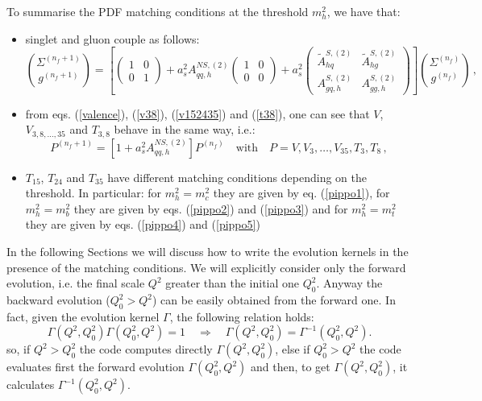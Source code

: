 \documentclass[10pt,a4paper]{article}
\begin{document}
To summarise the PDF matching conditions at the threshold $m_h^2$, we
have that:
\begin{itemize}
\item singlet and gluon couple as follows:
\begin{equation}
{\Sigma^{(n_f+1)} \choose g^{(n_f+1)}}=\left[\begin{pmatrix} 1 & 0 \\
    0 & 1\end{pmatrix}+a_s^2A_{qq,h}^{N\!S,(2)}\begin{pmatrix} 1 & 0
    \\ 0 & 0\end{pmatrix}+a_s^2\begin{pmatrix} \tilde{A}^{S,(2)}_{hq}
    & \tilde{A}^{S,(2)}_{hg} \\A^{S,(2)}_{gq,h} &
    A_{gg,h}^{S,(2)}\end{pmatrix}\right]{\Sigma^{(n_f)} \choose
  g^{(n_f)}}\,,\label{eq:couple}
\end{equation}
\item from eqs. (\ref{valence}), (\ref{v38}), (\ref{v152435}) and (\ref{t38}), one can see that $V$, $V_{3,8,\dots,35}$ and $T_{3,8}$ behave in the same way, i.e.:
\begin{equation}
P^{(n_f+1)}=[1+a_s^2A_{qq,h}^{N\!S,(2)}]P^{(n_f)}\quad\mbox{with}\quad
P=V,V_3,\dots,V_{35},T_3,T_8\,,\label{eq:ciao}
\end{equation}
\item $T_{15}$, $T_{24}$ and $T_{35}$ have different matching
  conditions depending on the threshold. In particular: for
  $m_h^2=m_c^2$ they are given by eq. (\ref{pippo1}), for
  $m_h^2=m_b^2$ they are given by eqs. (\ref{pippo2}) and
  (\ref{pippo3}) and for $m_h^2=m_t^2$ they are given by
  eqs. (\ref{pippo4}) and (\ref{pippo5})
\end{itemize}

In the following Sections we will discuss how to write the evolution
kernels in the presence of the matching conditions. We will explicitly
consider only the forward evolution, i.e. the final scale $Q^2$
greater than the initial one $Q_0^2$. Anyway the backward evolution
($Q_0^2>Q^2$) can be easily obtained from the forward one. In fact,
given the evolution kernel $\Gamma$, the following relation holds:
\begin{equation}
\Gamma(Q^2,Q_0^2)\Gamma(Q_0^2,Q^2)=1\quad\Longrightarrow\quad\Gamma(Q^2,Q_0^2)=\Gamma^{-1}(Q_0^2,Q^2).
\end{equation}
so, if $Q^2>Q_0^2$ the code computes directly $\Gamma(Q^2,Q_0^2)$, else if $Q^2_0>Q^2$ the code evaluates first the forward evolution $\Gamma(Q_0^2,Q^2)$ and then, to get $\Gamma(Q^2,Q_0^2)$, it calculates $\Gamma^{-1}(Q_0^2,Q^2)$.
\end{document}
